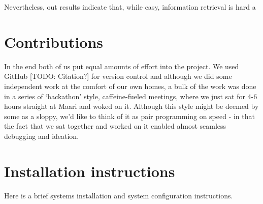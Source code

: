 Nevertheless, out results indicate that, while easy, information retrieval is hard a





\section{Contributions}
In the end both of us put equal amounts of effort into the project. 
We used GitHub [TODO: Citation?] for version control and although we did
some independent work at the comfort of our own homes, a bulk of the work
was done in a series of \lq hackathon' style, caffeine-fueled meetings, where we just sat
for 4-6 hours straight at Maari and woked on it. Although this style might be deemed by some
as a sloppy, we'd like to think of it as pair programming on speed - in that 
the fact that we sat together and worked on it enabled almost seamless debugging
and ideation.\\




\clearpage

\nocite{*}




\clearpage
\appendix
\section{Installation instructions} \label{App:instructions}

Here is a brief systems installation and system configuration instructions. 

